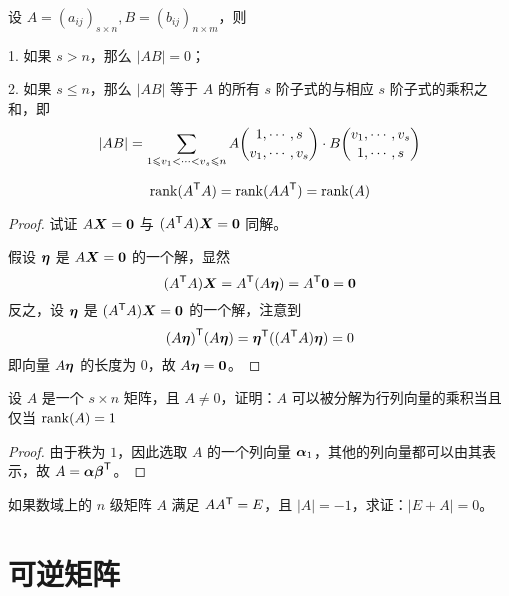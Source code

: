 \begin{theorem}
	设 $A = (a_{ij})_{s \times n},B = (b_{ij})_{n \times m}$，则
	
	1. 如果 $s>n$，那么 $|AB| = 0$；
	
	2. 如果 $s\leqslant n$，那么  $|AB|$ 等于 $A$ 的所有 $s$ 阶子式的与相应 $s$ 阶子式的乘积之和，即
	\[|AB|=\sum_{1 \leqslant v_1<\cdots< v_s \leqslant n}A \dbinom{1,\cdots,s}{v_1,\cdots,v_s} \cdot B \dbinom{v_1,\cdots,v_s}{1,\cdots,s}\]
\end{theorem}

\begin{theorem}
	\[ \operatorname{rank}({A}^\mathsf{T}A) = \operatorname{rank}(A {A}^\mathsf{T}) = \operatorname{rank}(A) \]
\end{theorem}

\begin{proof}
	试证 $A\boldsymbol{X} = \boldsymbol{0}$ 与 $({A}^\mathsf{T}A) \boldsymbol{X} = \boldsymbol{0}$ 同解。
	
	假设 $\boldsymbol{\eta}$ 是 $A \boldsymbol{X} = \boldsymbol{0}$ 的一个解，显然
	\[ ({A}^\mathsf{T}A) \boldsymbol{X} = {A}^\mathsf{T} (A \boldsymbol{\eta}) = {A}^\mathsf{T} \boldsymbol{0} = \boldsymbol{0} \]
	反之，设 $\boldsymbol{\eta}$ 是 $({A}^\mathsf{T}A) \boldsymbol{X} = \boldsymbol{0}$ 的一个解，注意到
	\[ {(A \boldsymbol{\eta})}^\mathsf{T}(A \boldsymbol{\eta}) = {\boldsymbol{\eta}}^\mathsf{T} (({A}^\mathsf{T}A) \boldsymbol{\eta}) = 0 \]
	即向量 $A \boldsymbol{\eta}$ 的长度为 $0$，故 $A \boldsymbol{\eta} = \boldsymbol{0}$。
\end{proof}

\begin{theorem}
	设 $A$ 是一个 $s \times n$ 矩阵，且 $A \neq 0$，证明：$A$ 可以被分解为行列向量的乘积当且仅当 $\operatorname{rank}(A) = 1$
\end{theorem}

\begin{proof}
	由于秩为 $1$，因此选取 $A$ 的一个列向量 $\boldsymbol{\alpha}_1$，其他的列向量都可以由其表示，故 $A = \boldsymbol{\alpha} {\boldsymbol{\beta}}^\mathsf{T}$。
\end{proof}

\begin{example}
	如果数域上的 $n$ 级矩阵 $A$ 满足 $A {A}^\mathsf{T} = E$，且 $|A| = -1$，求证：$|E+A| = 0$。
\end{example}

\begin{solution}
	
\end{solution}

\section{可逆矩阵}

